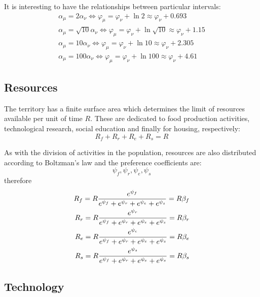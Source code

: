 \documentclass[a4paper,twoside]{article}
\begin{document}
It is interesting to have the relationships between particular intervals:
\begin{align*}
	\alpha_\mu = 2 \alpha_\nu \Leftrightarrow \varphi_\mu = \varphi_\nu + \ln 2 \approx \varphi_\nu + 0.693
	\\
	\alpha_\mu = \sqrt{10} \alpha_\nu \Leftrightarrow \varphi_\mu = \varphi_\nu + \ln\sqrt{10} \approx \varphi_\nu + 1.15
	\\
	\alpha_\mu = 10 \alpha_\nu \Leftrightarrow \varphi_\mu = \varphi_\nu + \ln 10 \approx \varphi_\nu + 2.305
	\\
	\alpha_\mu = 100 \alpha_\nu \Leftrightarrow \varphi_\mu = \varphi_\nu + \ln 100 \approx \varphi_\nu + 4.61
\end{align*}


\subsection{Resources}

The territory has a finite surface area which determines the limit of resources available per unit of time $ R $.
These are dedicated to food production activities, technological research, social education and finally for housing, respectively:
\begin{equation*}
	R_f + R_r + R_e + R_s = R
\end{equation*}

As with the division of activities in the population, resources are also distributed according to Boltzman's law and the preference coefficients are:
\begin{equation*}
	\psi_f, \psi_r, \psi_e, \psi_s
\end{equation*}
therefore
\begin{eqnarray}{\label{eq:res}}
	R_f = R \frac{e^{\psi_f}}{e^{\psi_f}+e^{\psi_r}+e^{\psi_e}+e^{\psi_s}} = R \beta_f
	\\
	R_r = R \frac{e^{\psi_r}}{e^{\psi_f}+e^{\psi_r}+e^{\psi_e}+e^{\psi_s}} = R \beta_r
	\\
	R_e = R \frac{e^{\psi_e}}{e^{\psi_f}+e^{\psi_r}+e^{\psi_e}+e^{\psi_s}} = R \beta_e
	\\
	R_s = R \frac{e^{\psi_s}}{e^{\psi_f}+e^{\psi_r}+e^{\psi_e}+e^{\psi_s}} = R \beta_s
\end{eqnarray}


\subsection{Technology}
\end{document}
